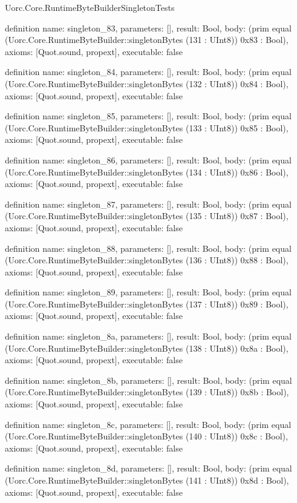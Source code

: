 \begin{lexlean}{Uorc.Core.RuntimeByteBuilderSingletonTests}
\begin{semanticmodule}
definition{
  name: singleton_83,
  parameters: [],
  result: Bool,
  body: (prim equal (Uorc.Core.RuntimeByteBuilder::singletonBytes (131 : UInt8)) 0x83 : Bool),
  axioms: [Quot.sound, propext],
  executable: false
}

definition{
  name: singleton_84,
  parameters: [],
  result: Bool,
  body: (prim equal (Uorc.Core.RuntimeByteBuilder::singletonBytes (132 : UInt8)) 0x84 : Bool),
  axioms: [Quot.sound, propext],
  executable: false
}

definition{
  name: singleton_85,
  parameters: [],
  result: Bool,
  body: (prim equal (Uorc.Core.RuntimeByteBuilder::singletonBytes (133 : UInt8)) 0x85 : Bool),
  axioms: [Quot.sound, propext],
  executable: false
}

definition{
  name: singleton_86,
  parameters: [],
  result: Bool,
  body: (prim equal (Uorc.Core.RuntimeByteBuilder::singletonBytes (134 : UInt8)) 0x86 : Bool),
  axioms: [Quot.sound, propext],
  executable: false
}

definition{
  name: singleton_87,
  parameters: [],
  result: Bool,
  body: (prim equal (Uorc.Core.RuntimeByteBuilder::singletonBytes (135 : UInt8)) 0x87 : Bool),
  axioms: [Quot.sound, propext],
  executable: false
}

definition{
  name: singleton_88,
  parameters: [],
  result: Bool,
  body: (prim equal (Uorc.Core.RuntimeByteBuilder::singletonBytes (136 : UInt8)) 0x88 : Bool),
  axioms: [Quot.sound, propext],
  executable: false
}

definition{
  name: singleton_89,
  parameters: [],
  result: Bool,
  body: (prim equal (Uorc.Core.RuntimeByteBuilder::singletonBytes (137 : UInt8)) 0x89 : Bool),
  axioms: [Quot.sound, propext],
  executable: false
}

definition{
  name: singleton_8a,
  parameters: [],
  result: Bool,
  body: (prim equal (Uorc.Core.RuntimeByteBuilder::singletonBytes (138 : UInt8)) 0x8a : Bool),
  axioms: [Quot.sound, propext],
  executable: false
}

definition{
  name: singleton_8b,
  parameters: [],
  result: Bool,
  body: (prim equal (Uorc.Core.RuntimeByteBuilder::singletonBytes (139 : UInt8)) 0x8b : Bool),
  axioms: [Quot.sound, propext],
  executable: false
}

definition{
  name: singleton_8c,
  parameters: [],
  result: Bool,
  body: (prim equal (Uorc.Core.RuntimeByteBuilder::singletonBytes (140 : UInt8)) 0x8c : Bool),
  axioms: [Quot.sound, propext],
  executable: false
}

definition{
  name: singleton_8d,
  parameters: [],
  result: Bool,
  body: (prim equal (Uorc.Core.RuntimeByteBuilder::singletonBytes (141 : UInt8)) 0x8d : Bool),
  axioms: [Quot.sound, propext],
  executable: false
}


\end{semanticmodule}
\end{lexlean}
